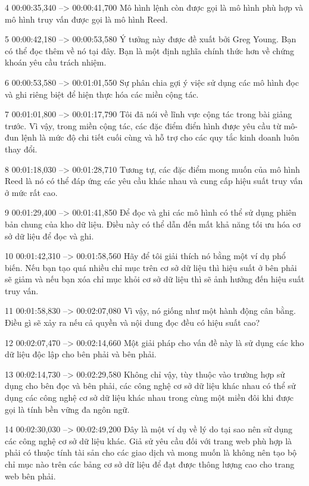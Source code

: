 4
00:00:35,340 --> 00:00:41,700
Mô hình lệnh còn được gọi là mô hình phù hợp và mô hình truy vấn được gọi là mô hình Reed.

5
00:00:42,180 --> 00:00:53,580
Ý tưởng này được đề xuất bởi Greg Young.  Bạn có thể đọc thêm về nó tại đây.  Bạn là một định nghĩa chính thức hơn về chứng khoán yêu cầu trách nhiệm.

6
00:00:53,580 --> 00:01:01,550
Sự phân chia gợi ý việc sử dụng các mô hình đọc và ghi riêng biệt để hiện thực hóa các miền cộng tác.

7
00:01:01,800 --> 00:01:17,790
Tôi đã nói về lĩnh vực cộng tác trong bài giảng trước.  Vì vậy, trong miền cộng tác, các đặc điểm điển hình được yêu cầu từ mô-đun lệnh là mức độ chi tiết cuối cùng và hỗ trợ cho các quy tắc kinh doanh luôn thay đổi.

8
00:01:18,030 --> 00:01:28,710
Tương tự, các đặc điểm mong muốn của mô hình Reed là nó có thể đáp ứng các yêu cầu khác nhau và cung cấp hiệu suất truy vấn ở mức rất cao.

9
00:01:29,400 --> 00:01:41,850
Để đọc và ghi các mô hình có thể sử dụng phiên bản chung của kho dữ liệu.  Điều này có thể dẫn đến mất khả năng tối ưu hóa cơ sở dữ liệu để đọc và ghi.

10
00:01:42,310 --> 00:01:58,560
Hãy để tôi giải thích nó bằng một ví dụ phổ biến.  Nếu bạn tạo quá nhiều chỉ mục trên cơ sở dữ liệu thì hiệu suất ở bên phải sẽ giảm và nếu bạn xóa chỉ mục khỏi cơ sở dữ liệu thì sẽ ảnh hưởng đến hiệu suất truy vấn.

11
00:01:58,830 --> 00:02:07,080
Vì vậy, nó giống như một hành động cân bằng.  Điều gì sẽ xảy ra nếu cả quyền và nội dung đọc đều có hiệu suất cao?

12
00:02:07,470 --> 00:02:14,660
Một giải pháp cho vấn đề này là sử dụng các kho dữ liệu độc lập cho bên phải và bên phải.

13
00:02:14,730 --> 00:02:29,580
Không chỉ vậy, tùy thuộc vào trường hợp sử dụng cho bên đọc và bên phải, các công nghệ cơ sở dữ liệu khác nhau có thể sử dụng các công nghệ cơ sở dữ liệu khác nhau trong cùng một miền đôi khi được gọi là tính bền vững đa ngôn ngữ.

14
00:02:30,030 --> 00:02:49,200
Đây là một ví dụ về lý do tại sao nên sử dụng các công nghệ cơ sở dữ liệu khác.  Giả sử yêu cầu đối với trang web phù hợp là phải có thuộc tính tài sản cho các giao dịch và mong muốn là không nên tạo bộ chỉ mục nào trên các bảng cơ sở dữ liệu để đạt được thông lượng cao cho trang web bên phải.

